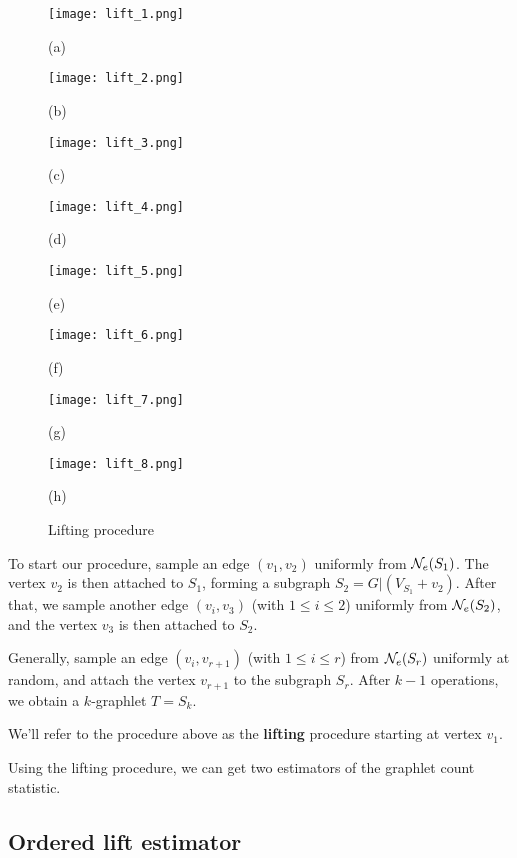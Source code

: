 \begin{figure}[th]
\begin{center}
\hspace*{\fill}
  \texttt{[image: lift\_1.png]}
  \caption*{(a)}
\endminipage\hfill
{}
  \texttt{[image: lift\_2.png]}
  \caption*{(b)}
\endminipage\hfill
{}
  \texttt{[image: lift\_3.png]}
  \caption*{(c)}\label{}
\endminipage\hfill
{}%
  \texttt{[image: lift\_4.png]}
  \caption*{(d)}
\endminipage
\hspace*{\fill}
\vskip 5pt
\hspace*{\fill}
  \texttt{[image: lift\_5.png]}
  \caption*{(e)}
\endminipage\hfill
{}
  \texttt{[image: lift\_6.png]}
  \caption*{(f)}
\endminipage\hfill
{}
  \texttt{[image: lift\_7.png]}
  \caption*{(g)}\label{}
\endminipage\hfill
{}%
  \texttt{[image: lift\_8.png]}
  \caption*{(h)}
\endminipage\hspace*{\fill}
\caption{Lifting procedure}
\end{center}
\end{figure}

	To start our procedure, sample an edge $(v_1,v_2)$ uniformly from $\mathcal{N}_e(S_1)$. 
	The vertex $v_2$ is then attached to $S_1$, forming a subgraph $S_2 = G|(V_{S_1} + {v_2})$.
	After that, we sample another edge $(v_i, v_3)$ (with $1\leq i\leq 2$) uniformly from $\mathcal{N}_e(S_2)$, and the vertex $v_3$ is then attached to $S_2$.
	
	Generally, sample an edge $(v_i, v_{r+1})$ (with $1\leq i \leq r$) from $\mathcal{N}_e(S_r)$ uniformly at random, and attach the vertex $v_{r+1}$ to the subgraph $S_r$.
	After $k-1$ operations, we obtain a $k$-graphlet $T = S_k$.
	
	We'll refer to the procedure above as the \textbf{lifting} procedure starting at vertex $v_1$.
	
	Using the lifting procedure, we can get two estimators of the graphlet count statistic.
	
	\subsection{Ordered lift estimator}
	
